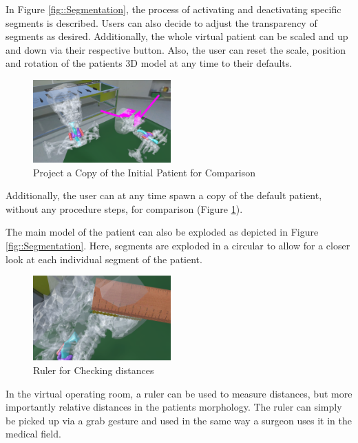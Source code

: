 In Figure \ref{fig::Segmentation}, the process of activating and deactivating specific segments is described.
Users can also decide to adjust the transparency of segments as desired.
Additionally, the whole virtual patient can be scaled and up and down via their respective button.
Also, the user can reset the scale, position and rotation of the patients 3D model at any time to their defaults.

\begin{figure}[ht]
  \centering
  \includegraphics[width=200px]{images/implementation/features/visualization/project_copy.png}
  \caption{\label{fig::ProjectCopy} Project a Copy of the Initial Patient for Comparison}
\end{figure}

Additionally, the user can at any time spawn a copy of the default patient, without any procedure steps, for comparison (Figure \ref{fig::ProjectCopy}).

The main model of the patient can also be exploded as depicted in Figure \ref{fig::Segmentation}.
Here, segments are exploded in a circular to allow for a closer look at each individual segment of the patient.

\begin{figure}[ht]
    \centering
    \includegraphics[width=200px]{images/implementation/features/visualization/ruler.png}
    \caption{\label{fig::FeatureRuler} Ruler for Checking distances}
\end{figure}

In the virtual operating room, a ruler can be used to measure distances, but more importantly relative distances in the patients morphology.
The ruler can simply be picked up via a grab gesture and used in the same way a surgeon uses it in the medical field.